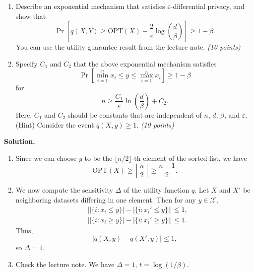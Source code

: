 \documentclass[12pt]{article}
\begin{document}
\begin{enumerate}
\begin{enumerate}
    \item[(c)] Describe an exponential mechanism that satisfies $\varepsilon$-differential privacy, and show that
    \[
    \Pr\left[q(X, Y) \geq \text{OPT}(X) - \frac{2}{\varepsilon} \log\left( \frac{d}{\beta} \right) \right] \geq 1 - \beta.
    \]
    You can use the utility guarantee result from the lecture note. \textit{(10 points)}

    \item[(d)] Specify $C_1$ and $C_2$ that the above exponential mechanism satisfies
    \[
    \Pr\left[ \min_{i=1}^n x_i \leq y \leq \max_{i=1}^n x_i \right] \geq 1 - \beta
    \]
    for
    \[
    n \geq \frac{C_1}{\varepsilon} \ln\left( \frac{d}{\beta} \right) + C_2.
    \]
    Here, $C_1$ and $C_2$ should be constants that are independent of $n$, $d$, $\beta$, and $\varepsilon$.\\
    (Hint) Consider the event $q(X, y) \geq 1$. \textit{(10 points)}
\end{enumerate}


\begin{solution}
\textbf{Solution.}\\
\begin{enumerate}
    \item[(a)] Since we can choose $y$ to be the $\lfloor n/2 \rfloor$-th element of the sorted list, we have
    \[
    \text{OPT}(X) \geq \left\lfloor \frac{n}{2} \right\rfloor \geq \frac{n - 1}{2}.
    \]

    \item[(b)] We now compute the sensitivity $\Delta$ of the utility function $q$. Let $X$ and $X'$ be neighboring datasets differing in one element. Then for any $y \in \mathcal{X}$,
    \begin{align*}
        & \left| |\{i : x_i \le y\}| - |\{i : x_i' \le y\}| \right| \le 1, \\
        & \left| |\{i : x_i \ge y\}| - |\{i : x_i' \ge y\}| \right| \le 1.
    \end{align*}
    Thus,
    \[
    |q(X, y) - q(X', y)| \le 1,
    \]
    so $\Delta = 1$.
    
    \item[(c)] Check the lecture note. We have $\Delta = 1$, $t = \log(1/\beta)$.


\end{enumerate}
\end{solution}
\end{enumerate}
\end{document}
